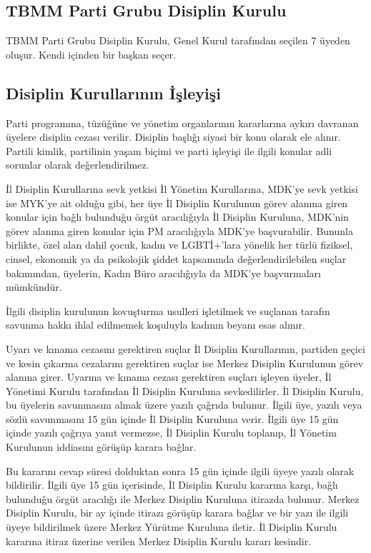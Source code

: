 \documentclass[11pt]{article} %
\begin{document}
\subsection{TBMM Parti Grubu Disiplin Kurulu}
TBMM Parti Grubu Disiplin Kurulu, Genel Kurul tarafından seçilen 7 üyeden oluşur. Kendi içinden bir başkan seçer.
\subsection{Disiplin Kurullarının İşleyişi}
Parti programına, tüzüǧüne ve yönetim organlarının kararlarına aykırı davranan üyelere disiplin cezası verilir. Disiplin başlıǧı siyasi bir konu olarak ele alınır. Partili kimlik, partilinin yaşam biçimi ve parti işleyişi ile ilgili konular adli sorunlar olarak deǧerlendirilmez.

İl Disiplin Kurullarına sevk yetkisi İl Yönetim Kurullarına, MDK’ye sevk yetkisi ise MYK’ye ait olduǧu gibi, her üye İl Disiplin Kurulunun görev alanına giren konular için baǧlı bulunduǧu örgüt aracılıǧıyla İl Disiplin Kuruluna, MDK’nin görev alanına giren konular için PM aracılıǧıyla MDK’ye başvurabilir. Bununla birlikte, özel alan dahil çocuk, kadın ve LGBTİ+’lara yönelik her türlü fiziksel, cinsel, ekonomik ya da psikolojik şiddet kapsamında deǧerlendirilebilen suçlar bakımından, üyelerin, Kadın Büro aracılıǧıyla da MDK’ye başvurmaları mümkündür.

İlgili disiplin kurulunun kovuşturma usulleri işletilmek ve suçlanan tarafın
savunma hakkı ihlal edilmemek koşuluyla kadının beyanı esas alınır.

Uyarı ve kınama cezasını gerektiren suçlar İl Disiplin Kurullarının, partiden geçici ve kesin çıkarma cezalarını gerektiren suçlar ise Merkez Disiplin Kurulunun görev alanına girer.
Uyarma ve kınama cezası gerektiren suçları işleyen üyeler, İl Yönetimi Kurulu tarafından İl Disiplin Kuruluna sevkedilirler. İl Disiplin Kurulu, bu üyelerin savunmasını almak üzere yazılı çaǧrıda bulunur. İlgili üye, yazılı veya sözlü savunmasını 15 gün içinde İl Disiplin Kuruluna verir. İlgili üye 15 gün içinde yazılı çaǧrıya yanıt vermezse, İl Disiplin Kurulu toplanıp, İl Yönetim Kurulunun iddiasını görüşüp karara baǧlar.

Bu kararını cevap süresi dolduktan sonra 15 gün içinde ilgili üyeye yazılı olarak bildirilir. İlgili üye 15 gün içerisinde, İl Disiplin Kurulu kararına karşı, baǧlı bulunduǧu örgüt aracılıǧı ile Merkez Disiplin Kuruluna itirazda bulunur. Merkez Disiplin Kurulu, bir ay içinde itirazı görüşüp karara baǧlar ve bir yazı ile ilgili üyeye bildirilmek üzere Merkez Yürütme Kuruluna iletir. İl Disiplin Kurulu kararına itiraz üzerine verilen Merkez Disiplin Kurulu kararı kesindir.
\end{document}
